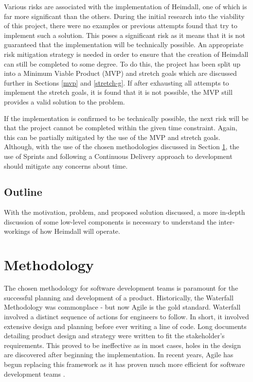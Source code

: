 \documentclass{article}
\begin{document}
Various risks are associated with the implementation of Heimdall, one of which is far more significant than the others. During the initial research into the viability of this project, there were no examples or previous attempts found that try to implement such a solution. This poses a significant risk as it means that it is not guaranteed that the implementation will be technically possible. An appropriate risk mitigation strategy is needed in order to ensure that the creation of Heimdall can still be completed to some degree. To do this, the project has been split up into a Minimum Viable Product (MVP) and stretch goals which are discussed further in Sections \ref{mvp} and \ref{stretch-g}. If after exhausting all attempts to implement the stretch goals, it is found that it is not possible, the MVP still provides a valid solution to the problem. \\\par If the implementation is confirmed to be technically possible, the next risk will be that the project cannot be completed within the given time constraint. Again, this can be partially mitigated by the use of the MVP and stretch goals. Although, with the use of the chosen methodologies discussed in Section \ref{methodology}, the use of Sprints and following a Continuous Delivery approach to development should mitigate any concerns about time.

\subsection{Outline}
With the motivation, problem, and proposed solution discussed, a more in-depth discussion of some low-level components is necessary to understand the inter-workings of how Heimdall will operate.

 
\section{Methodology} \label{methodology}
The chosen methodology for software development teams is paramount for the successful planning and development of a product. Historically, the Waterfall Methodology was commonplace - but now Agile is the gold standard. Waterfall involved a distinct sequence of actions for engineers to follow. In short, it involved extensive design and planning before ever writing a line of code. Long documents detailing product design and strategy were written to fit the stakeholder's requirements. This proved to be ineffective as in most cases, holes in the design are discovered after beginning the implementation. In recent years, Agile has begun replacing this framework as it has proven much more efficient for software development teams \cite{agile-waterfall}.
\end{document}

